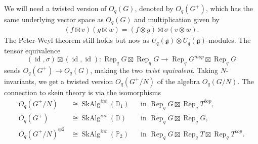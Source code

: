 \documentclass[a4paper]{article}
\numberwithin{equation}{section}
\newcommand{\1}{{\mathrm{1}\mkern-4mu{\mathchoice{}{}{\mskip-0.5mu}{\mskip-1mu}}\mathrm{l}}}
\newcommand{\DD}{\mathbb{D}}
\newcommand{\PP}{\mathbb{P}}
\DeclareMathOperator{\Rep}{Rep}
\newcommand{\g}{\mathfrak{g}}
\DeclareMathOperator{\SkAlg}{SkAlg}
\DeclareMathOperator{\id}{id}
\begin{document}
We will need a twisted version of $O_q(G)$, denoted by $O_q(G^+)$, which has the same underlying vector space as $O_q(G)$ and multiplication given by
\begin{align}\label{eq:Gp-multiplication}
    (f \boxtimes v)(g\boxtimes w) = (f \otimes g) \boxtimes \sigma(v \otimes w). 
\end{align}
The Peter-Weyl theorem still holds but now as $U_q(\g) \otimes U_q(\g)$-modules.
The tensor equivalence 
\begin{equation}
    (\id,\sigma)\boxtimes (\id,\id) : \Rep_q G \boxtimes \Rep_qG \to \Rep_qG^{mop} \boxtimes \Rep_qG
\end{equation}
sends $O_q(G^+) \to O_q(G)$, making the two \emph{twist equivalent}.
Taking $N$-invariants, we get a twisted version $O_q(G^+/N)$ of the algebra $O_q(G/N)$.
The connection to skein theory is via the isomorphisms
  \begin{align}
    O_q(G^+/N) &\cong \SkAlg^{int}(\DD_1) &&\text{in } \Rep_q G \boxtimes \Rep_q T^{bop}, \\
    O_q(G^+) &\cong \SkAlg^{int}(\DD) &&\text{in }  \Rep_qG\boxtimes \Rep_qG, \\
    O_q(G^+/N)^{\otimes2} &\cong \SkAlg^{int}(\PP_2) && \text{in } \Rep_qG \boxtimes \Rep_qT \boxtimes \Rep_qT^{bop}.
  \end{align}
\end{document}
